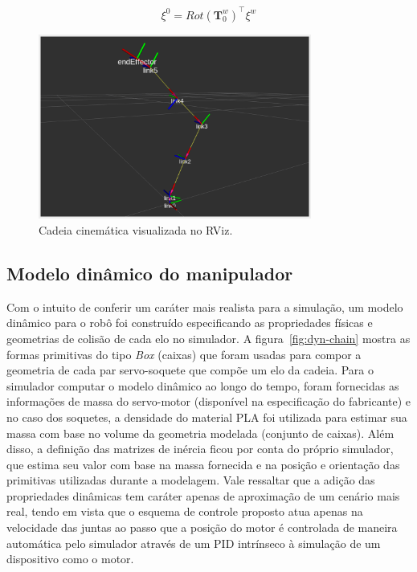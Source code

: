 \begin{equation}
    \xi^0 = {Rot(\mathbf{T}^w_0)}^\top \xi^w
\end{equation}

\begin{figure}
    \centering
    \includegraphics[width=0.8\textwidth]{./Images/rviz-chain.png}
    \caption{Cadeia cinemática visualizada no RViz.}\label{fig:kin-chain}
\end{figure}

\subsection*{Modelo dinâmico do manipulador}

Com o intuito de conferir um caráter mais realista para a simulação, um modelo
dinâmico para o robô foi construído especificando as propriedades físicas e
geometrias de colisão de cada elo no simulador. A figura~\ref{fig:dyn-chain}
mostra as formas primitivas do tipo \emph{Box} (caixas) que foram usadas para
compor a geometria de cada par servo-soquete que compõe um elo da cadeia. Para
o simulador computar o modelo dinâmico ao longo do tempo, foram fornecidas as
informações de massa do servo-motor (disponível na especificação do fabricante)
e no caso dos soquetes, a densidade do material PLA foi utilizada para estimar
sua massa com base no volume da geometria modelada (conjunto de caixas). Além
disso, a definição das matrizes de inércia ficou por conta do próprio
simulador, que estima seu valor com base na massa fornecida e na posição e
orientação das primitivas utilizadas durante a modelagem. Vale ressaltar que a
adição das propriedades dinâmicas tem caráter apenas de aproximação de um cenário
mais real, tendo em vista que o esquema de controle proposto atua apenas na
velocidade das juntas ao passo que a posição do motor é controlada de maneira
automática pelo simulador através de um PID intrínseco à simulação de um
dispositivo como o motor.

